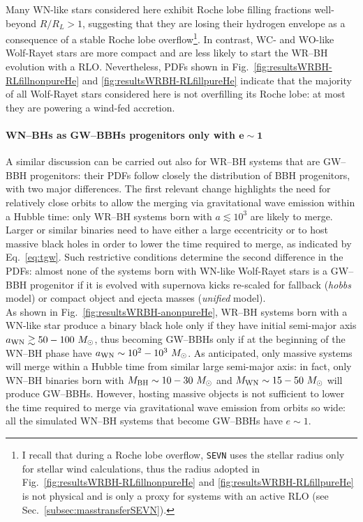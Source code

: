 \documentclass[a4paper,titlepage]{book}     	%
\newcommand{\sun}{\ensuremath{_\odot}}
\newcommand{\msun}{\ensuremath{M\sun}}
\begin{document}
Many WN-like stars considered here exhibit Roche lobe filling fractions well-beyond $R/R_L > 1$, suggesting that they are losing their hydrogen envelope as a consequence of a stable Roche lobe overflow\footnote{I recall that during a Roche lobe overflow, \texttt{SEVN} uses the stellar radius only for stellar wind calculations, thus the radius adopted in Fig.\ \ref{fig:resultsWRBH-RLfillnonpureHe} and \ref{fig:resultsWRBH-RLfillpureHe} is not physical and is only a proxy for systems with an active RLO (see Sec.\ \ref{subsec:masstransferSEVN}).}. In contrast, WC- and WO-like Wolf-Rayet stars are more compact and are less likely to start the WR--BH evolution with a RLO. Nevertheless, PDFs shown in Fig.\ \ref{fig:resultsWRBH-RLfillnonpureHe} and \ref{fig:resultsWRBH-RLfillpureHe} indicate that the majority of all Wolf-Rayet stars considered here is not overfilling its Roche lobe: at most they are powering a wind-fed accretion.\\


\paragraph{WN--BHs as GW--BBHs progenitors only with $\boldsymbol{e \sim 1}$} A similar discussion can be carried out also for WR--BH systems that are GW--BBH progenitors: their PDFs follow closely the distribution of BBH progenitors, with two major differences. The first relevant change highlights the need for relatively close orbits to allow the merging via gravitational wave emission within a Hubble time: only WR--BH systems born with $a \lesssim 10^3$ are likely to merge. Larger or similar binaries need to have either a large eccentricity or to host massive black holes in order to lower the time required to merge, as indicated by Eq.\ \ref{eq:tgw}. Such restrictive conditions determine the second difference in the PDFs: almost none of the systems born with WN-like Wolf-Rayet stars is a GW--BBH progenitor if it is evolved with supernova kicks re-scaled for fallback (\emph{hobbs} model) or compact object and ejecta masses (\emph{unified} model).\\

As shown in Fig.\ \ref{fig:resultsWRBH-anonpureHe}, WR--BH systems born with a WN-like star produce a binary black hole only if they have initial semi-major axis $a_{\rm WN} \gtrsim 50-100 ~ \msun$, thus becoming GW--BBHs only if at the beginning of the WN--BH phase have $a_{\rm WN} \sim 10^2 - 10^3 ~ \msun$. As anticipated, only massive systems will merge within a Hubble time from similar large semi-major axis: in fact, only WN--BH binaries born with $M_{\rm BH} \sim 10-30~\msun$ and $M_{\rm WN} \sim 15-50~\msun$ will produce GW--BBHs. However, hosting massive objects is not sufficient to lower the time required to merge via gravitational wave emission from orbits so wide: all the simulated WN--BH systems that become GW--BBHs have $e \sim 1$. 
\end{document}

